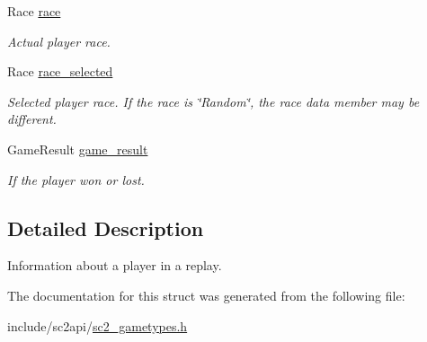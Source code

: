 \begin{DoxyCompactItemize}
Race \hyperlink{structsc2_1_1_replay_player_info_a4ab3c2d0a8d9d784be2404c671f1d143}{race}
\begin{DoxyCompactList}\small\item\em Actual player race. \end{DoxyCompactList}\item 
\mbox{\label{structsc2_1_1_replay_player_info_ad8061fc9f5910207eff1faa2437cdfae}} 
Race \hyperlink{structsc2_1_1_replay_player_info_ad8061fc9f5910207eff1faa2437cdfae}{race\+\_\+selected}
\begin{DoxyCompactList}\small\item\em Selected player race. If the race is \char`\"{}\+Random\char`\"{}, the race data member may be different. \end{DoxyCompactList}\item 
\mbox{\label{structsc2_1_1_replay_player_info_ad10393848e92ccfe4c2add12bd3528c5}} 
Game\+Result \hyperlink{structsc2_1_1_replay_player_info_ad10393848e92ccfe4c2add12bd3528c5}{game\+\_\+result}
\begin{DoxyCompactList}\small\item\em If the player won or lost. \end{DoxyCompactList}\end{DoxyCompactItemize}


\subsection{Detailed Description}
Information about a player in a replay. 

The documentation for this struct was generated from the following file\+:\begin{DoxyCompactItemize}
\item 
include/sc2api/\hyperlink{sc2__gametypes_8h}{sc2\+\_\+gametypes.\+h}\end{DoxyCompactItemize}
